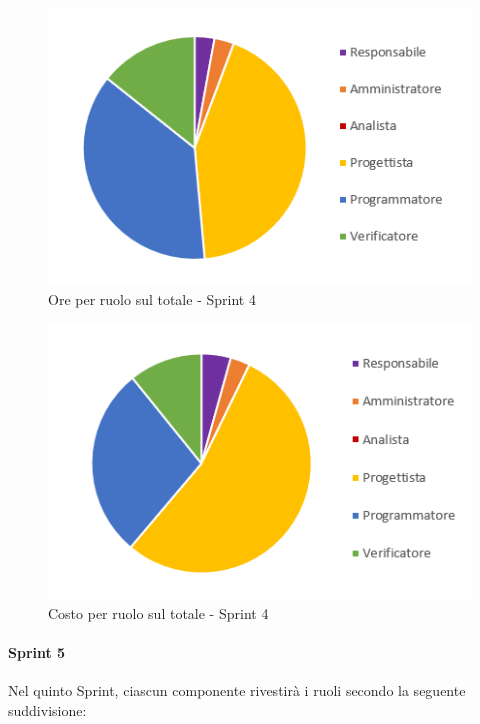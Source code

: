 \begin{figure}[H]
  \centering
  \includegraphics[scale=0.8]{immagini/4Sprint_oreRuolo.png}
  \caption{Ore per ruolo sul totale - Sprint 4}
\end{figure}

\begin{figure}[H]
  \centering
  \includegraphics[scale=0.8]{immagini/4Sprint_costoRuolo.png}
  \caption{Costo per ruolo sul totale - Sprint 4}
\end{figure}
\pagebreak


\paragraph{Sprint 5} \label{paragraph:preventivo_sprint5}
Nel quinto Sprint\glo{}, ciascun componente rivestirà i ruoli secondo la seguente suddivisione:

